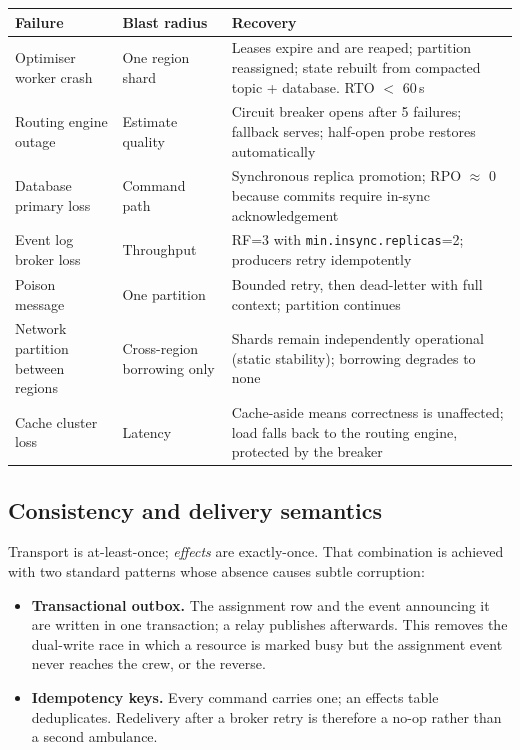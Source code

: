 \begin{center}\footnotesize
\begin{tabular}{@{}p{34mm}p{44mm}p{50mm}@{}}
\toprule
\textbf{Failure} & \textbf{Blast radius} & \textbf{Recovery} \\
\midrule
Optimiser worker crash & One region shard & Leases expire and are reaped; partition reassigned; state rebuilt from compacted topic + database. RTO $<$ 60\,s \\
Routing engine outage & Estimate quality & Circuit breaker opens after 5 failures; fallback serves; half-open probe restores automatically \\
Database primary loss & Command path & Synchronous replica promotion; RPO $\approx$ 0 because commits require in-sync acknowledgement \\
Event log broker loss & Throughput & RF=3 with \texttt{min.insync.replicas}=2; producers retry idempotently \\
Poison message & One partition & Bounded retry, then dead-letter with full context; partition continues \\
Network partition between regions & Cross-region borrowing only & Shards remain independently operational (static stability); borrowing degrades to none \\
Cache cluster loss & Latency & Cache-aside means correctness is unaffected; load falls back to the routing engine, protected by the breaker \\
\bottomrule
\end{tabular}
\end{center}

\subsection{Consistency and delivery semantics}

Transport is at-least-once; \emph{effects} are exactly-once. That combination
is achieved with two standard patterns whose absence causes subtle corruption:

\begin{itemize}
\item \textbf{Transactional outbox.} The assignment row and the event
      announcing it are written in one transaction; a relay publishes
      afterwards. This removes the dual-write race in which a resource is
      marked busy but the assignment event never reaches the crew, or the
      reverse.
\item \textbf{Idempotency keys.} Every command carries one; an effects table
      deduplicates. Redelivery after a broker retry is therefore a no-op
      rather than a second ambulance.
\end{itemize}

